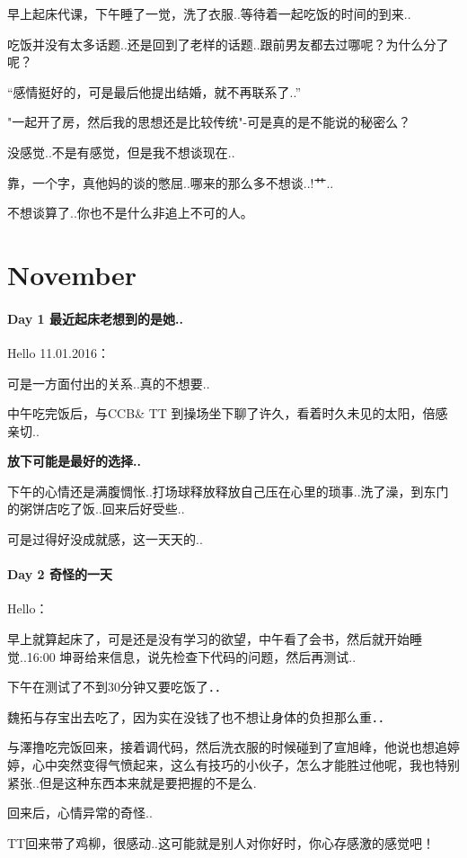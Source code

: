 \documentclass[UTF8,a4paper,8pt]{ctexbook}
\begin{document}
	 	 早上起床代课，下午睡了一觉，洗了衣服..等待着一起吃饭的时间的到来..
	 	 
	 	 吃饭并没有太多话题..还是回到了老样的话题..跟前男友都去过哪呢？为什么分了呢？
	 	 
	 	 “感情挺好的，可是最后他提出结婚，就不再联系了..”
	 	 
	 	 "一起开了房，然后我的思想还是比较传统"-可是真的是不能说的秘密么？
	 	 
	 	 没感觉..不是有感觉，但是我不想谈现在..
	 	 
	 	 靠，一个字，真他妈的谈的憋屈..哪来的那么多不想谈..!艹..
	 	 
	 	 不想谈算了..你也不是什么非追上不可的人。
 \section*{November}
 	 \paragraph{Day 1   最近起床老想到的是她..    \quad     }
	 	 Hello 11.01.2016：
	 	 
	 	 可是一方面付出的关系..真的不想要..
	 	 
	 	 中午吃完饭后，与CCB\& TT 到操场坐下聊了许久，看着时久未见的太阳，倍感亲切..
	 	 
	 	 \textbf{放下可能是最好的选择..}
	 	 
	 	 下午的心情还是满腹惆怅..打场球释放释放自己压在心里的琐事..洗了澡，到东门的粥饼店吃了饭..回来后好受些..
	 	 
	 	 可是过得好没成就感，这一天天的..
 	 \paragraph{Day 2   奇怪的一天    \quad     }
	 	 Hello：
	 	 
	 	 早上就算起床了，可是还是没有学习的欲望，中午看了会书，然后就开始睡觉..16:00 坤哥给来信息，说先检查下代码的问题，然后再测试..
	 	 
	 	 下午在测试了不到30分钟又要吃饭了．．
	 	 
	 	 魏拓与存宝出去吃了，因为实在没钱了也不想让身体的负担那么重．．
	 	 
	 	 与澤撸吃完饭回来，接着调代码，然后洗衣服的时候碰到了宣旭峰，他说也想追婷婷，心中突然变得气愤起来，这么有技巧的小伙子，怎么才能胜过他呢，我也特别紧张..但是这种东西本来就是要把握的不是么.
	 	 
	 	 回来后，心情异常的奇怪..
	 	 
	 	 TT回来带了鸡柳，很感动..这可能就是别人对你好时，你心存感激的感觉吧！
	 	 
\end{document}
